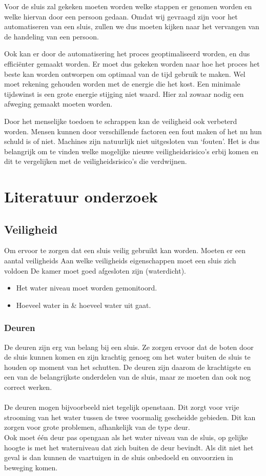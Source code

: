 \documentclass{article}
\begin{document}
Voor de sluis zal gekeken moeten worden welke stappen er genomen worden en welke hiervan door een persoon gedaan. Omdat wij gevraagd zijn voor het automatiseren van een sluis, zullen we dus moeten kijken naar het vervangen van de handeling van een persoon.

Ook kan er door de automatisering het proces geoptimaliseerd worden, en dus efficiënter gemaakt worden. Er moet dus gekeken worden naar hoe het proces het beste kan worden ontworpen om optimaal van de tijd gebruik te maken. Wel moet rekening gehouden worden met de energie die het kost. Een minimale tijdswinst is een grote energie stijging niet waard. Hier zal zowaar nodig een afweging gemaakt moeten worden.

Door het menselijke toedoen te schrappen kan de veiligheid ook verbeterd worden. Mensen kunnen door verschillende factoren een fout maken of het nu hun schuld is of niet. Machines zijn natuurlijk niet uitgesloten van ‘fouten’. Het is dus belangrijk om te vinden welke mogelijke nieuwe veiligheidsrisico’s erbij komen en dit te vergelijken met de veiligheidsrisico’s die verdwijnen.

\clearpage

\section{Literatuur onderzoek} %

\subsection{Veiligheid}
Om ervoor te zorgen dat een sluis veilig gebruikt kan worden. Moeten er een aantal veiligheids 
Aan welke veiligheids eigenschappen moet een sluis zich voldoen
De kamer moet goed afgesloten zijn (waterdicht).
\begin{itemize}
\item Het water niveau moet worden gemonitoord.
\item Hoeveel water in \& hoeveel water uit gaat.
\end{itemize}

\subsubsection{Deuren}
De deuren zijn erg van belang bij een sluis. Ze zorgen ervoor dat de boten door de sluis kunnen komen en zijn krachtig genoeg om het water buiten de sluis te houden op moment van het schutten. De deuren zijn daarom de krachtigste en een van de belangrijkste onderdelen van de sluis, maar ze moeten dan ook nog correct werken.
\\\\
De deuren mogen bijvoorbeeld niet tegelijk openstaan. Dit zorgt voor vrije strooming van het water tussen de twee voormalig gescheidde gebieden. Dit kan zorgen voor grote problemen, afhankelijk van de type deur.\\
Ook moet één deur pas opengaan als het water niveau van de sluis, op gelijke hoogte is met het waterniveau dat zich buiten de deur bevindt. Als dit niet het geval is dan kunnen de vaartuigen in de sluis onbedoeld en onvoorzien in beweging komen.
\end{document}
